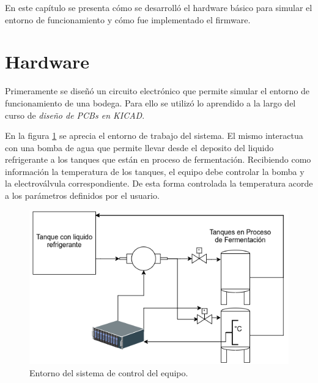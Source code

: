 En este capítulo se presenta cómo se desarrolló el hardware básico para simular el entorno de funcionamiento y cómo fue implementado el firmware.

\section{Hardware}

Primeramente se diseñó un circuito electrónico que permite simular el entorno de funcionamiento de una bodega. Para ello se utilizó lo aprendido a la largo del curso de \emph{diseño de PCBs en KICAD}. 

En la figura \ref{fig:diagrama_sistema} se aprecia el entorno de trabajo del sistema. El mismo interactua con una bomba de agua que permite llevar desde el deposito del liquido refrigerante a los tanques que están en proceso de fermentación.
Recibiendo como información la temperatura de los tanques, el equipo debe controlar la bomba y la electroválvula correspondiente. De esta forma controlada la temperatura acorde a los parámetros definidos por el usuario. 


\begin{figure}[!htb]
  \centering
  \includegraphics[scale=0.7]{./Figures/diagrama_del_sistema.png}
  \caption{Entorno del sistema de control del equipo.}
  \label{fig:diagrama_sistema}
\end{figure}

